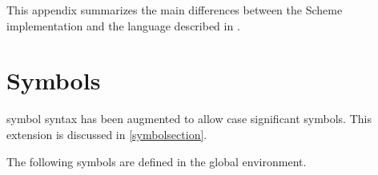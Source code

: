 %
%
%

\newcommand{\schglob}[1]{*#1*}

This appendix summarizes the main differences between the {\stk} Scheme
implementation and the language described in {\rrrr}.

\section{Symbols}

{\stk} symbol syntax has been augmented to allow case significant symbols. 
This extension is discussed in \ref{symbolsection}.

The following symbols are defined in the global environment.

